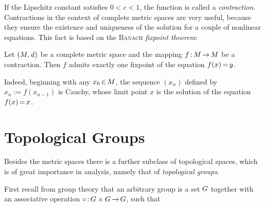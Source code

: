 \documentclass[11pt,twoside]{article}
\begin{document}
\subparagraph{}
If the Lipschitz constant satisfies $0 < c < 1$,
the function is called a \textit{contraction}.
Contractions in the context of complete metric spaces
are very useful,
because they ensure the existence and uniqueness
of the solution for a couple of nonlinear equations.
This fact is based on the \textsc{Banach} \textit{fixpoint theorem}:

\begin{theorem}\label{BANACH_FIXPOINT_THEOREM}
Let $(M,\mathit{d})$ be a complete metric space
and the mapping $f {\,:\,} M {\,\to\,} M$ be a contraction.
Then $f$ admits exactly one fixpoint of the equation $f(x) {\,=\,} y$.
\end{theorem}

\subparagraph{}
Indeed,
beginning with any $x_0 {\,\in\,} M$,
the sequence $(x_n)$ defined by $x_n := f(x_{n-1})$ is Cauchy,
whose limit point $x$ is the solution of the equation $f(x) {\,=\,} x$.

\part{Topological Groups}                                                      %
Besides the metric spaces there is a further subclass of topological spaces,
which is of great importance in analysis,
namely that of \textit{topological groups}.

\subparagraph{}
First recall from group theory
that an arbitrary group is a set $G$ together with
an associative operation $\circ {\,:\,} G \times G {\,\to\,} G$, such that
\end{document}
